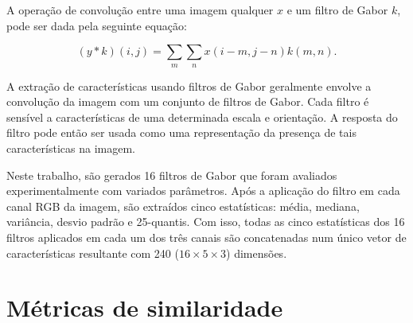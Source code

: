 \begin{figure}[!h]
        \captionsetup{width=12cm}
		\centering
\end{figure}
\FloatBarrier{}

A operação de convolução entre uma imagem qualquer $ x $ e um filtro de
Gabor $ k $, pode ser dada pela seguinte equação:

\begin{equation}
  (y * k)(i, j) = \sum_{m} \sum_{n} x(i-m, j-n) k(m, n).
\end{equation}

A extração de características usando filtros de Gabor geralmente
envolve a convolução da imagem com um conjunto de filtros de
Gabor. Cada filtro é sensível a características de uma determinada
escala e orientação. A resposta do filtro pode então ser usada como
uma representação da presença de tais características na imagem.

Neste trabalho, são gerados 16 filtros de Gabor que foram avaliados
experimentalmente com variados parâmetros. Após a aplicação do filtro
em cada canal RGB da imagem, são extraídos cinco estatísticas: média,
mediana, variância, desvio padrão e 25-quantis. Com isso, todas as
cinco estatísticas dos 16 filtros aplicados em cada um dos três canais
são concatenadas num único vetor de características resultante com 240
($16 \times 5 \times 3$) dimensões.

\section{Métricas de similaridade}\label{sec:teorica-metricas-de-similaridade}


